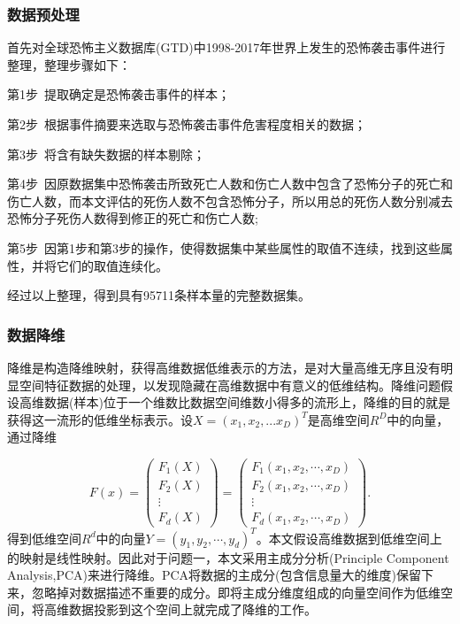 \documentclass[bwprint]{gmcmthesis}
\begin{document}
\subsubsection{数据预处理}
首先对全球恐怖主义数据库(GTD)中1998-2017年世界上发生的恐怖袭击事件进行整理，整理步骤如下：

第1步\ 提取确定是恐怖袭击事件的样本；

第2步\ 根据事件摘要来选取与恐怖袭击事件危害程度相关的数据；

第3步\ 将含有缺失数据的样本剔除；

第4步\ 因原数据集中恐怖袭击所致死亡人数和伤亡人数中包含了恐怖分子的死亡和伤亡人数，而本文评估的死伤人数不包含恐怖分子，所以用总的死伤人数分别减去恐怖分子死伤人数得到修正的死亡和伤亡人数;

第5步\ 因第1步和第3步的操作，使得数据集中某些属性的取值不连续，找到这些属性，并将它们的取值连续化。

经过以上整理，得到具有95711条样本量的完整数据集。

\subsubsection{数据降维}
降维是构造降维映射，获得高维数据低维表示的方法，是对大量高维无序且没有明显空间特征数据的处理，以发现隐藏在高维数据中有意义的低维结构。降维问题假设高维数据(样本)位于一个维数比数据空间维数小得多的流形上，降维的目的就是获得这一流形的低维坐标表示。设$\mathit{X}=(x_1,x_2,...x_D)^T$是高维空间$R^D$中的向量，通过降维

\begin{equation}
\mathit{F}(x)=\left( \begin{matrix}{}
\mathit{F}_1(X) \\ 
\mathit{F}_2(X) \\ 
\vdots \\ 
\mathit{F}_d(X)
\end{matrix}\right) =\left( \begin{matrix}{}
\mathit{F}_1(x_1,x_2,\cdots,x_D) \\ 
\mathit{F}_2(x_1,x_2,\cdots,x_D) \\ 
\vdots \\ 
\mathit{F}_d(x_1,x_2,\cdots,x_D)
\end{matrix}\right).
\end{equation}
得到低维空间$\mathit{R}^d$中的向量$\mathit{Y}=(y_1,y_2,\cdots,y_d)^T$。本文假设高维数据到低维空间上的映射是线性映射。因此对于问题一，本文采用主成分分析(Principle Component Analysis,PCA)来进行降维。PCA将数据的主成分(包含信息量大的维度)保留下来，忽略掉对数据描述不重要的成分。即将主成分维度组成的向量空间作为低维空间，将高维数据投影到这个空间上就完成了降维的工作。
\end{document}
